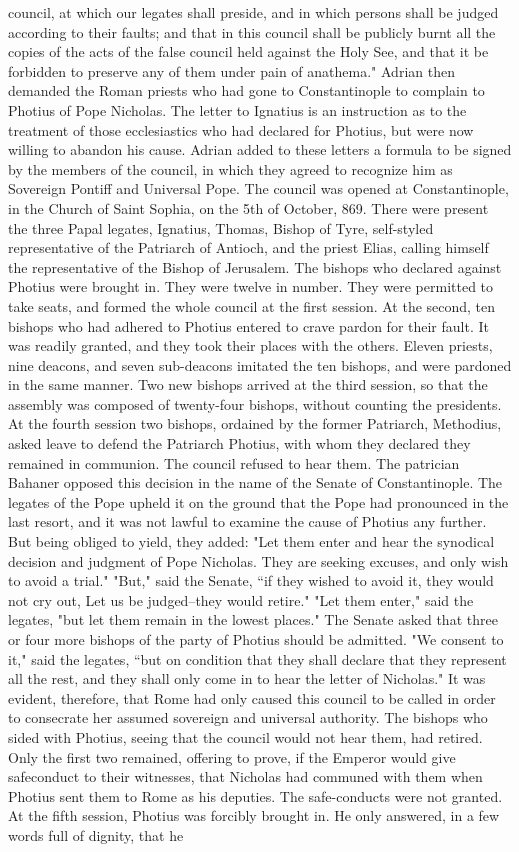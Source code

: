 council, at which our legates shall preside, and in which persons shall be judged according to their faults; and that in this council shall be publicly burnt all the copies of the acts of the false council held against the Holy See, and that it be forbidden to preserve any of them under pain of anathema." Adrian then demanded the Roman priests who had gone to Constantinople to complain to Photius of Pope Nicholas. The letter to Ignatius is an instruction as to the treatment of those ecclesiastics who had declared for Photius, but were now willing to abandon his cause. Adrian added to these letters a formula to be signed by the members of the council, in which they agreed to recognize him as Sovereign Pontiff and Universal Pope. The council was opened at Constantinople, in the Church of Saint Sophia, on the 5th of October, 869. There were present the three Papal legates, Ignatius, Thomas, Bishop of Tyre, self-styled representative of the Patriarch of Antioch, and the priest Elias, calling himself the representative of the Bishop of Jerusalem. The bishops who declared against Photius were brought in. They were twelve in number. They were permitted to take seats, and formed the whole council at the first session. At the second, ten bishops who had adhered to Photius entered to crave pardon for their fault. It was readily granted, and they took their places with the others. Eleven priests, nine deacons, and seven sub-deacons imitated the ten bishops, and were pardoned in the same manner. Two new bishops arrived at the third session, so that the assembly was composed of twenty-four bishops, without counting the presidents. At the fourth session two bishops, ordained by the former Patriarch, Methodius, asked leave to defend the Patriarch Photius, with whom they declared they remained in communion. The council refused to hear them. The patrician Bahaner opposed this decision in the name of the Senate of Constantinople. The legates of the Pope upheld it on the ground that the Pope had pronounced in the last resort, and it was not lawful to examine the cause of Photius any further. But being obliged to yield, they added: "Let them enter and hear the synodical decision and judgment of Pope Nicholas. They are seeking excuses, and only wish to avoid a trial." "But," said the Senate, “if they wished to avoid it, they would not cry out, Let us be judged--they would retire." "Let them enter," said the legates, "but let them remain in the lowest places." The Senate asked that three or four more bishops of the party of Photius should be admitted. "We consent to it," said the legates, “but on condition that they shall declare that they represent all the rest, and they shall only come in to hear the letter of Nicholas." It was evident, therefore, that Rome had only caused this council to be called in order to consecrate her assumed sovereign and universal authority. The bishops who sided with Photius, seeing that the council would not hear them, had retired. Only the first two remained, offering to prove, if the Emperor would give safeconduct to their witnesses, that Nicholas had communed with them when Photius sent them to Rome as his deputies. The safe-conducts were not granted. At the fifth session, Photius was forcibly brought in. He only answered, in a few words full of dignity, that he 